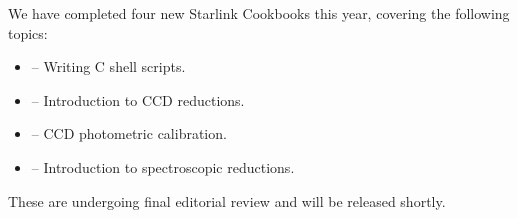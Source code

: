 We have completed four new Starlink Cookbooks this year, covering the
following topics:

\begin{itemize}
\item {} -- Writing C shell scripts. 

\item {} -- Introduction to CCD reductions.

\item {} -- CCD photometric calibration.

\item {} -- Introduction to spectroscopic reductions.
\end{itemize}

These are undergoing final editorial review and will be released shortly.


